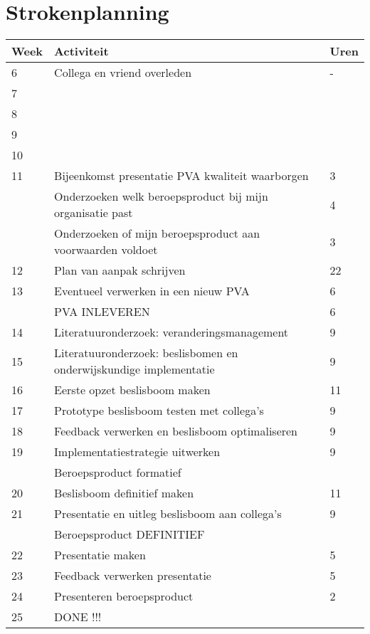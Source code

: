  \section{Strokenplanning}
 \begin{tabular}{|l|p{10cm}|l|}
    \hline
    Week & Activiteit & Uren \\
    \hline
    6  & Collega en vriend overleden & - \\
    7  &  &  \\
    8  &  &  \\
    9  &  &  \\
    10 &  &  \\
    11 & Bijeenkomst presentatie PVA kwaliteit waarborgen & 3 \\
       & Onderzoeken welk beroepsproduct bij mijn organisatie past & 4 \\
       & Onderzoeken of mijn beroepsproduct aan voorwaarden voldoet & 3 \\
    12 & Plan van aanpak schrijven & 22 \\
    13 & Eventueel verwerken in een nieuw PVA & 6 \\
       & PVA INLEVEREN & 6 \\
    14 & Literatuuronderzoek: veranderingsmanagement & 9 \\
    15 & Literatuuronderzoek: beslisbomen en onderwijskundige implementatie & 9 \\
    16 & Eerste opzet beslisboom maken & 11 \\
    17 & Prototype beslisboom testen met collega’s & 9 \\
    18 & Feedback verwerken en beslisboom optimaliseren & 9 \\
    19 & Implementatiestrategie uitwerken & 9 \\
       & Beroepsproduct formatief &   \\
    20 & Beslisboom definitief maken & 11 \\
    21 & Presentatie en uitleg beslisboom aan collega’s & 9 \\
       & Beroepsproduct DEFINITIEF & \\
    22 & Presentatie maken & 5 \\
    23 & Feedback verwerken presentatie & 5 \\
    24 & Presenteren beroepsproduct & 2 \\
    25 & DONE !!! & \\

    \hline
\end{tabular}